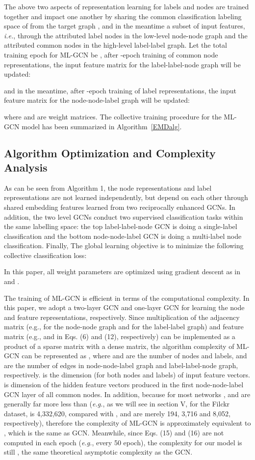 \documentclass[conference]{IEEEtran}
\begin{document}
The above two aspects of representation learning for labels and nodes are trained together and impact one another by sharing the common classification labeling space of  from the target graph , and in the meantime a subset of input features, \textit{i.e.}, through the attributed label nodes in the low-level node-node graph and the attributed common nodes in the high-level label-label graph. Let the total training epoch for ML-GCN be , after -epoch training of common node representations, the input feature matrix for the label-label-node graph will be updated:

and in the meantime, after -epoch training of label representations, the input feature matrix for the node-node-label graph will be updated:

where  and  are weight matrices. The collective training procedure for the ML-GCN model has been summarized in Algorithm~\ref{EMDalg}.
\subsection{Algorithm Optimization and Complexity Analysis}
As can be seen from Algorithm 1, the node representations and label representations are not learned independently, but depend on each other through shared embedding features learned from two reciprocally enhanced GCNs. In addition, the two level GCNs conduct two supervised classification tasks within the same labelling space: the top label-label-node GCN is doing a single-label classification and the bottom node-node-label GCN is doing a multi-label node classification. Finally, The global learning objective is to minimize the following collective classification loss:

In this paper, all weight parameters are optimized using gradient descent as in \cite{14} and  \cite{25}.

The training of ML-GCN is efficient in terms of the computational complexity. In this paper, we adopt a two-layer GCN and one-layer GCN for learning the node and feature representations, respectively. Since multiplication of the adjacency matrix (e.g.,  for the node-node graph and  for the label-label graph) and feature matrix (e.g.,  and  in Eqs. (6) and (12), respectively) can be implemented as a product of a sparse matrix with a dense matrix, the algorithm complexity of ML-GCN can be represented as , where  and  are the number of nodes and labels,  and  are the number of edges in node-node-label graph and label-label-node graph, respectively.  is the dimension (for both nodes and labels) of input feature vectors.  is dimension of the hidden feature vectors produced in the first node-node-label GCN layer of all common nodes. In addition, because for most networks  ,  and  are generally far more less than  (\textit{e.g.}, as we will see in section V, for the Filckr dataset,  is 4,332,620, compared with ,  and  are merely 194, 3,716 and 8,052, respectively), therefore the complexity of ML-GCN is approximately equivalent to , which is the same as GCN. Meanwhile, since Eqs. (15) and (16) are not computed in each epoch (\textit{e.g.}, every 50 epoch), the complexity for our model is still , the same theoretical asymptotic complexity as the GCN.
\end{document}
